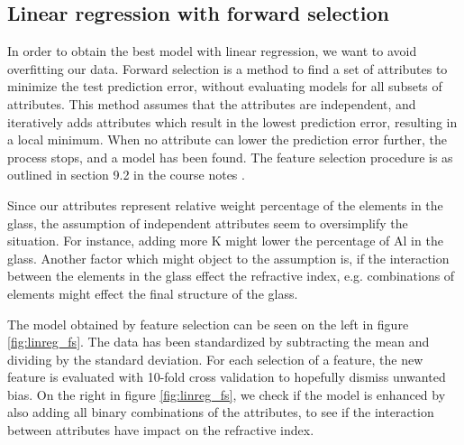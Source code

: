 \subsection{Linear regression with forward selection}
In order to obtain the best model with linear regression, we want to avoid overfitting our data. Forward selection is a method to find a set of attributes to minimize the test prediction error, without evaluating models for all subsets of attributes. This method assumes that the attributes are independent, and iteratively adds attributes which result in the lowest prediction error, resulting in a local minimum. When no attribute can lower the prediction error further, the process stops, and a model has been found. The feature selection procedure is as outlined in section 9.2 in the course notes \cite{coursenotes}.

Since our attributes represent relative weight percentage of the elements in the glass, the assumption of independent attributes seem to oversimplify the situation. For instance, adding more K might lower the percentage of Al in the glass. Another factor which might object to the assumption is, if the interaction between the elements in the glass effect the refractive index, e.g. combinations of elements might effect the final structure of the glass.

The model obtained by feature selection can be seen on the left in figure \ref{fig:linreg_fs}. The data has been standardized by subtracting the mean and dividing by the standard deviation. For each selection of a feature, the new feature is evaluated with 10-fold cross validation to hopefully dismiss unwanted bias. On the right in figure \ref{fig:linreg_fs}, we check if the model is enhanced by also adding all binary combinations of the attributes, to see if the interaction between attributes have impact on the refractive index.

